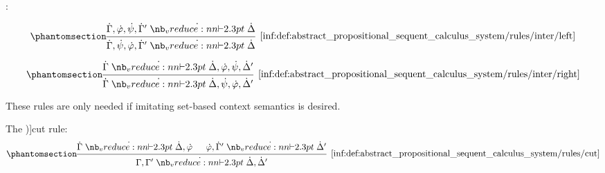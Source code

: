 \begin{definition}
\begin{thmenum}
     :
    \begin{paracol}{2}
      \begin{leftcolumn}
        \ParacolAlignmentHack
        \begin{equation*}\taglabel[\ensuremath{ \logic{Inter}_L }]{inf:def:abstract_propositional_sequent_calculus_system/rules/inter/left}
          \begin{prooftree}
            \hypo{ \syn\Gamma, \syn\varphi, \syn\psi, \syn\Gamma' \synvdash \syn\Delta }
            \infer1[\ref{inf:def:abstract_propositional_sequent_calculus_system/rules/inter/left}]{ \syn\Gamma, \syn\psi, \syn\varphi, \syn\Gamma' \synvdash \syn\Delta }
          \end{prooftree}
        \end{equation*}
      \end{leftcolumn}

      \begin{rightcolumn}
        \ParacolAlignmentHack
        \begin{equation*}\taglabel[\ensuremath{ \logic{Inter}_R }]{inf:def:abstract_propositional_sequent_calculus_system/rules/inter/right}
          \begin{prooftree}
            \hypo{ \syn\Gamma \synvdash \syn\Delta, \syn\varphi, \syn\psi, \syn\Delta' }
            \infer1[\ref{inf:def:abstract_propositional_sequent_calculus_system/rules/inter/right}]{ \syn\Gamma \synvdash \syn\Delta, \syn\psi, \syn\varphi, \syn\Delta' }
          \end{prooftree}
        \end{equation*}
      \end{rightcolumn}
    \end{paracol}

    These rules are only needed if imitating set-based context semantics is desired.

     The \term[ru=правило сечения (\cite[219]{КолмогоровДрагалин2006Логика})]{cut rule}:
    \begin{equation*}\taglabel[\logic{Cut}]{inf:def:abstract_propositional_sequent_calculus_system/rules/cut}
      \begin{prooftree}
        \hypo{ \syn\Gamma \synvdash \syn\Delta, \syn\varphi }
        \hypo{ \syn\varphi, \syn\Gamma' \synvdash \syn\Delta' }
        \infer2[\ref{inf:def:abstract_propositional_sequent_calculus_system/rules/cut}]{ \Gamma, \Gamma' \synvdash \syn\Delta, \syn\Delta' }
      \end{prooftree}
    \end{equation*}
  \end{thmenum}
\end{definition}

